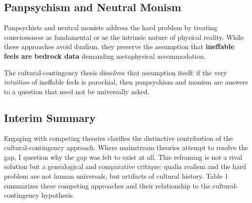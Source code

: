 \documentclass[11pt,a4paper]{article}
\begin{document}
\subsection{Panpsychism and Neutral Monism}

Panpsychists \cite{goff2017} and neutral monists \cite{strawson2008} address the hard problem by treating consciousness as fundamental or as the intrinsic nature of physical reality. While these approaches avoid dualism, they preserve the assumption that \textbf{ineffable feels are bedrock data} demanding metaphysical accommodation.

The cultural-contingency thesis dissolves that assumption itself: if the very \emph{intuition} of ineffable feels is parochial, then panpsychism and monism are answers to a question that need not be universally asked.

\subsection{Interim Summary}

Engaging with competing theories clarifies the distinctive contribution of the cultural-contingency approach. Where mainstream theories attempt to resolve the gap, I question why the gap was felt to exist at all. This reframing is not a rival solution but a genealogical and comparative critique: qualia realism and the hard problem are not human universals, but artifacts of cultural history. Table 1 summarizes these competing approaches and their relationship to the cultural-contingency hypothesis.
\end{document}
